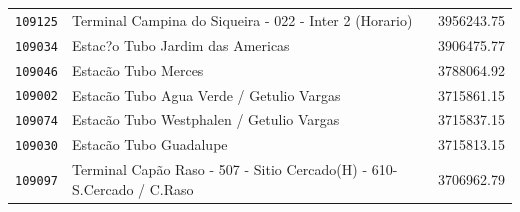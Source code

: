 \begin{table}[htb]
\begin{tabular}{p{1.0cm}p{8.0cm}p{3.0cm} }
       \texttt{109125} &                                      Terminal Campina do Siqueira - 022 - Inter 2 (Horario)  & 3956243.75 \\
       \texttt{109034} &                                                            Estac?o Tubo Jardim das Americas  & 3906475.77 \\
       \texttt{109046} &                                                                         Estacão Tubo Merces  & 3788064.92 \\
       \texttt{109002} &                                                    Estacão Tubo Agua Verde / Getulio Vargas  & 3715861.15 \\
       \texttt{109074} &                                                    Estacão Tubo Westphalen / Getulio Vargas  & 3715837.15 \\
       \texttt{109030} &                                                                      Estacão Tubo Guadalupe  & 3715813.15 \\
       \texttt{109097} &                       Terminal Capão Raso - 507 - Sitio Cercado(H) - 610-S.Cercado / C.Raso  & 3706962.79 \\
        \hline  
    \end{tabular}
\end{table}




